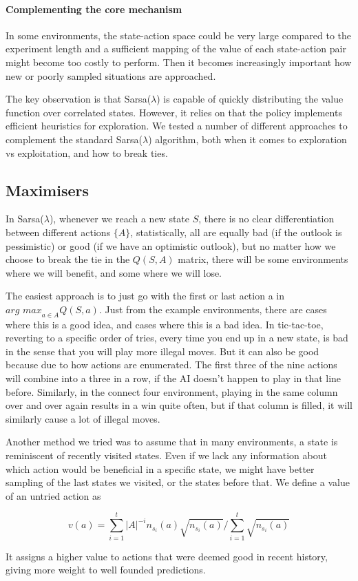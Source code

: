 \paragraph{Complementing the core mechanism}
In some environments, the state-action space could be very large compared to the
experiment length and a sufficient mapping of the value of each state-action
pair might become too costly to perform. Then it becomes increasingly important
how new or poorly sampled situations are approached.

The key observation is that Sarsa($\lambda$) is capable of quickly distributing
the value function over correlated states. However, it relies on that the policy
implements efficient heuristics for exploration. We tested a number of different
approaches to complement the standard Sarsa($\lambda$) algorithm, both when it
comes to exploration vs exploitation, and how to break ties. 

\subsection{Maximisers}
In Sarsa($\lambda$), whenever we reach a new state $S$, there is no clear
differentiation between different actions $\{A\}$, statistically, all are
equally bad (if the outlook is pessimistic) or good (if we have an optimistic
outlook), but no matter how we choose to break the tie in the $Q(S,A)$ matrix,
there will be some environments where we will benefit, and some where we will
lose.

The easiest approach is to just go with the first or last action a in $\textit{arg
    max}_{a \in A} Q(S,a)$. Just from the example environments, there
are cases where this is a good idea, and cases where this is a bad idea. In tic-tac-toe, reverting to a specific order of tries, every time you end up in a new
state, is bad in the sense that you will play more illegal moves. But it can also
be good because due to how actions are enumerated. The first three of the nine
actions will combine into a three in a row, if the AI doesn't happen to play in
that line before. Similarly, in the connect four environment, playing in the
same column over and over again results in a win quite often, but if that column
is filled, it will similarly cause a lot of illegal moves.

Another method we tried was to assume that in many environments, a state is
reminiscent of recently visited states. Even if we lack any information about
which action would be beneficial in a specific state, we might have better
sampling of the last states we visited, or the states before that. We define a value of an untried action as

\begin{equation}
    v(a) = \sum_{i=1}^{t} \vert{A}\vert^{-i} n_{s_i}(a)
    \sqrt{n_{s_i}(a)}\Big/\sum_{i=1}^{t} \sqrt{n_{s_i}(a)}
\end{equation}

It assigns a higher value to actions that were deemed good in recent history,
giving more weight to well founded predictions.